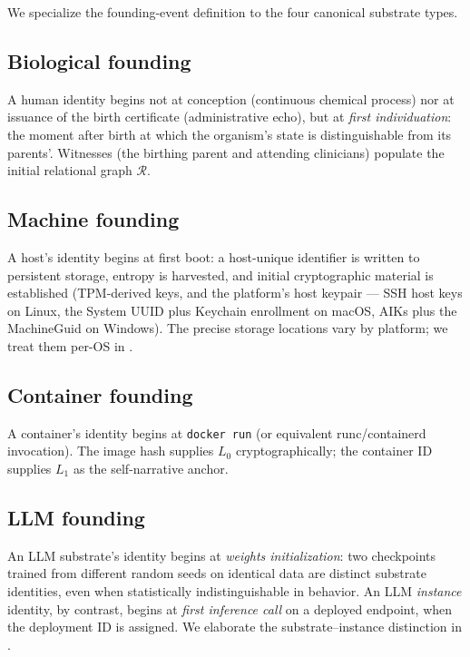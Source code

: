 \documentclass[11pt,a4paper,parskip=half-,DIV=12,headings=standardclasses]{scrartcl}
\theoremstyle{ncthm}
\theoremstyle{ncdef}
\newcommand{\relations}{\mathcal{R}}
\begin{document}
We specialize the founding-event definition to the four canonical
substrate types.

\subsection{Biological founding}

A human identity begins not at conception (continuous chemical
process) nor at issuance of the birth certificate (administrative
echo), but at \emph{first individuation}: the moment after birth at
which the organism's state is distinguishable from its parents'.
Witnesses (the birthing parent and attending clinicians) populate the
initial relational graph $\relations$.

\subsection{Machine founding}

A host's identity begins at first boot: a host-unique identifier is
written to persistent storage, entropy is harvested, and initial
cryptographic material is established (TPM-derived keys, and the
platform's host keypair --- SSH host keys on Linux, the System UUID
plus Keychain enrollment on macOS, AIKs plus the MachineGuid on
Windows). The precise storage locations vary by platform; we treat
them per-OS in .

\subsection{Container founding}

A container's identity begins at \texttt{docker run} (or equivalent
runc/containerd invocation). The image hash supplies $L_0$
cryptographically; the container ID supplies $L_1$ as the
self-narrative anchor.

\subsection{LLM founding}

An LLM substrate's identity begins at \emph{weights initialization}:
two checkpoints trained from different random seeds on identical
data are distinct substrate identities, even when statistically
indistinguishable in behavior. An LLM \emph{instance} identity, by
contrast, begins at \emph{first inference call} on a deployed
endpoint, when the deployment ID is assigned. We elaborate the
substrate--instance distinction in .
\end{document}
